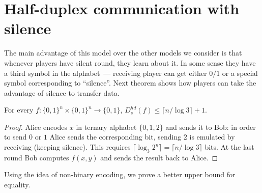 \section{Half-duplex communication with silence}\label{sec:hds}
The main advantage of this model over the other models we consider is that whenever players have
silent round, they learn about it. In some sense they have a third symbol in the alphabet~--- receiving player can get either $0/1$ or a special symbol corresponding to ``silence''.
Next theorem shows how players can take
the advantage of silence to transfer data.

\begin{theorem}
For every $f: \{0,1\}^n\times\{0,1\}^n\to \{0,1\}$, $D^{hd}_s(f)\le \lceil n / \log 3 \rceil + 1$.
\end{theorem}
\begin{proof}
Alice encodes $x$ in ternary alphabet $\{0,1,2\}$
and sends it to Bob: in order to send $0$ or $1$ Alice sends the corresponding bit, sending $2$ is
emulated by receiving (keeping silence). This requires $\lceil\log_3 2^n\rceil = \lceil n /
\log 3\rceil$ bits.  At the last round Bob computes $f(x,y)$ and sends the result back to Alice.
\end{proof}

Using the idea of non-binary encoding, we prove a better upper bound for equality.

